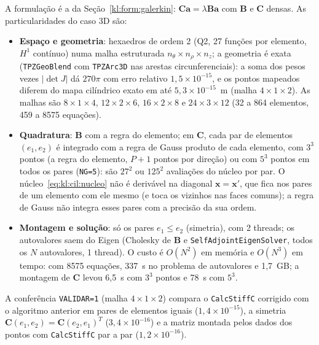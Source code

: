 A formulação é a da Seção~\ref{kl:form:galerkin}: $\mathbf{C}\mathbf{a} = \lambda \mathbf{B}\mathbf{a}$ com
$\mathbf{B}$ e $\mathbf{C}$ densas. As particularidades do caso 3D são:
\begin{itemize}
  \item \textbf{Espaço e geometria}: hexaedros de ordem 2 (Q2, 27 funções por elemento, $H^1$ contínuo) numa malha
    estruturada $n_\theta \times n_\rho \times n_z$; a geometria é exata (\texttt{TPZGeoBlend} com \texttt{TPZArc3D}
    nas arestas circunferenciais): a soma dos pesos vezes $|\det J|$ dá $270\pi$ com erro relativo
    $1{,}5 \times 10^{-15}$, e os pontos mapeados diferem do mapa cilíndrico exato em até $5{,}3 \times 10^{-15}$~m
    (malha $4 \times 1 \times 2$). As malhas são $8 \times 1 \times 4$, $12 \times 2 \times 6$, $16 \times 2 \times 8$ e
    $24 \times 3 \times 12$ (32 a 864 elementos, 459 a 8575 equações).
  \item \textbf{Quadratura}: $\mathbf{B}$ com a regra do elemento; em $\mathbf{C}$, cada par de elementos
    $(e_1, e_2)$ é integrado com a regra de Gauss produto de cada elemento, com $3^3$ pontos (a regra do elemento,
    $P + 1$ pontos por direção) ou com $5^3$ pontos em todos os pares (\texttt{NG=5}): são $27^2$ ou $125^2$
    avaliações do núcleo por par. O núcleo~\eqref{eq:kl:cil:nucleo} não é derivável na diagonal
    $\mathbf{x} = \mathbf{x}'$, que fica nos pares de um elemento com ele mesmo (e toca os vizinhos nas faces comuns);
    a regra de Gauss não integra esses pares com a precisão da sua ordem.
  \item \textbf{Montagem e solução}: só os pares $e_1 \le e_2$ (simetria), com 2 threads; os autovalores saem do
    Eigen (Cholesky de $\mathbf{B}$ e \texttt{SelfAdjointEigenSolver}, todos os $N$ autovalores, 1 thread). O custo é
    $O(N^2)$ em memória e $O(N^3)$ em tempo: com 8575 equações, 337~s no problema de autovalores e 1,7~GB; a montagem de
    $\mathbf{C}$ levou 6,5~s com $3^3$ pontos e 78~s com $5^3$.
\end{itemize}
A conferência \texttt{VALIDAR=1} (malha $4 \times 1 \times 2$) compara o \texttt{CalcStiffC} corrigido com o
algoritmo anterior em pares de elementos iguais ($1{,}4 \times 10^{-15}$), a simetria
$\mathbf{C}(e_1, e_2) = \mathbf{C}(e_2, e_1)^T$ ($3{,}4 \times 10^{-16}$) e a matriz montada pelos dados dos pontos
com \texttt{CalcStiffC} par a par ($1{,}2 \times 10^{-16}$).

